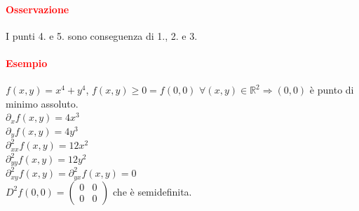 \documentclass{article}
\newcommand{\R}{\mathbb{R}}
\begin{document}
\paragraph{\textcolor{red}{Osservazione}}
I punti 4. e 5. sono conseguenza di 1., 2. e 3.

\paragraph{\textcolor{red}{Esempio}}
$f(x,y)=x^4+y^4$, $f(x,y)\geq 0 = f(0,0)$ $\forall (x,y)\in \R^2 \Rightarrow (0,0)$ è punto di minimo assoluto.\\
$\partial_xf(x,y)=4x^3$\\
$\partial_yf(x,y)=4y^3$\\
$\partial_{xx}^2f(x,y)=12x^2$\\
$\partial_{yy}^2f(x,y)=12y^2$\\
$\partial_{xy}^2f(x,y)=\partial_{yx}^2f(x,y)=0$\\
$D^2f(0,0)=\begin{pmatrix}
    0&0\\
    0&0
\end{pmatrix}$
che è semidefinita.
\end{document}
